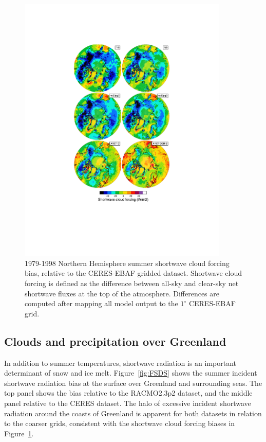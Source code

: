 \documentclass[draft]{agujournal2019}
\begin{document}
\begin{figure}[t]
\begin{center}
         \includegraphics[width=100mm]{temp_contours_diffCERES_SWCF.pdf}
\end{center}
\caption{1979-1998 Northern Hemisphere summer shortwave cloud forcing bias, relative to the CERES-EBAF gridded dataset. Shortwave cloud forcing is defined as the difference between all-sky and clear-sky net shortwave fluxes at the top of the atmosphere. Differences are computed after mapping all model output to the $1^{\circ}$ CERES-EBAF grid.}
\label{fig:SWCF}
\end{figure}

\subsection{Clouds and precipitation over Greenland}

In addition to summer temperatures, shortwave radiation is an important determinant of snow and ice melt. Figure~\ref{fig:FSDS} shows the summer incident shortwave radiation bias at the surface over Greenland and surrounding seas. The top panel shows the bias relative to the RACMO2.3p2 dataset, and the middle panel relative to the CERES dataset. The halo of excessive incident shortwave radiation around the coasts of Greenland is apparent for both datasets in relation to the coarser grids, consistent with the shortwave cloud forcing biases in Figure~\ref{fig:SWCF}.
\end{document}
